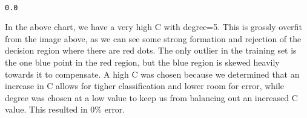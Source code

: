 \documentclass[11pt]{article}
\begin{document}
    \begin{center}
    \end{center}
    { \hspace*{\fill} \\}
    
    \begin{Verbatim}[commandchars=\\\{\}]
0.0

    \end{Verbatim}

    In the above chart, we have a very high C with degree=5. This is grossly
overfit from the image above, as we can see some strong formation and
rejection of the decision region where there are red dots. The only
outlier in the training set is the one blue point in the red region, but
the blue region is skewed heavily towards it to compensate. A high C was
chosen because we determined that an increase in C allows for tigher
classification and lower room for error, while degree was chosen at a
low value to keep us from balancing out an increased C value. This
resulted in 0\% error.
\end{document}
